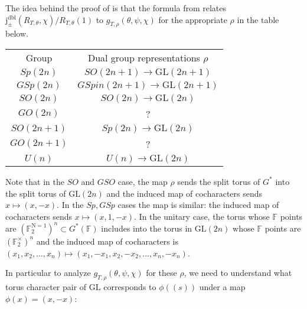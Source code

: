 \documentclass[12pt, reqno]{amsart}
\theoremstyle{definition}
\theoremstyle{definition}
\theoremstyle{definition}
\newcommand{\GL}{\mathrm{GL}}
\newcommand{\aFieldNorm}{\mathrm{N}}
\newcommand{\finiteField}{\mathbb{F}}
\newcommand{\finiteFieldExtension}[1]{\finiteField_{#1}}
\newcommand{\NormOneGroup}[1]{\finiteFieldExtension{#1}^{\aFieldNorm = 1}}
\newcommand{\dblVirtualJacobiSumScalar}[2]{\mathrm{j}_{\pm}^{\mathrm{dbl}}\left(#1, #2\right)}
\begin{document}
The idea behind the proof of  is that the formula from  relates $\dblVirtualJacobiSumScalar{R_{T, \theta}}{\chi}/R_{T,\theta}(1)$ to $g_{T,\rho}(\theta,\psi,\chi)$ for the appropriate $\rho$ in the table below. 
\begin{center}
\begin{tabular}{ c c}
 Group & Dual group representations $\rho$ \\ 
 $Sp(2n)$ &$SO(2n+1) \to \GL(2n+1)$\\  
 $GSp(2n)$  &$GSpin(2n+1) \to \GL(2n+1)$ \\
 $SO(2n)$ &$SO(2n) \to \GL(2n)$ \\
 $GO(2n)$ & ? \\
 $SO(2n+1)$ &$Sp(2n) \to \GL(2n)$ \\
 $GO(2n+1)$ & ? \\ 
  $U(n)$  & $U(n) \to \GL(2n)$  
\end{tabular}
\end{center}
Note that in the $SO$ and $GSO$ case, the map $\rho$ sends the split torus of $G^*$ into the split torus of $\GL(2n)$ and the induced map of cocharacters sends $x \mapsto (x,-x)$. In the $Sp,GSp$ cases the map is similar: the induced map of cocharacters sends $x \mapsto (x,1,-x)$. In the unitary case, the torus whose $\finiteField$ points are $(\NormOneGroup{2})^n \subset G^*(\finiteField)$ includes into the torus in $\GL(2n)$ whose $\finiteField$ points are $(\finiteFieldExtension{2}^\times)^n$ and the induced map of cocharacters is $(x_1,x_2, \hdots, x_n) \mapsto (x_1,-x_1,x_2,-x_2, \hdots ,x_n,-x_n)$. 


In particular to analyze $g_{T,\rho}(\theta,\psi,\chi)$ for these $\rho$, we need to understand what torus character pair of $\GL$ corresponds to $\phi((s))$ under a map $\phi(x) = (x,-x)$:
\end{document}
